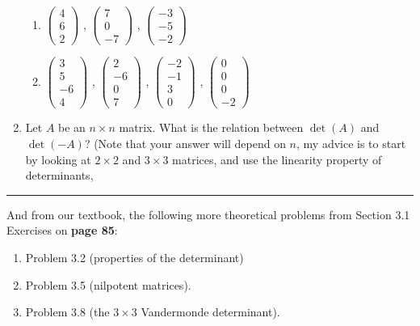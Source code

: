 \documentclass[11pt]{article}     \parskip=5pt
\begin{document}
\begin{enumerate}
\begin{enumerate}
\item 
$\begin{pmatrix}
 4\\ 6 \\ 2
\end{pmatrix}$ 
, $\begin{pmatrix}
7\\ 0 \\ -7
\end{pmatrix}$ 
, $\begin{pmatrix}
 -3\\ -5 \\ -2
\end{pmatrix}$ 


\item 
$\begin{pmatrix}
3 \\ 5 \\ -6 \\ 4
\end{pmatrix}$ 
, $\begin{pmatrix}
2 \\ -6 \\ 0 \\ 7
\end{pmatrix}$ 
, $\begin{pmatrix}
-2 \\ -1 \\ 3 \\ 0
\end{pmatrix}$ 
, $\begin{pmatrix}
0 \\ 0 \\ 0 \\ -2
\end{pmatrix}$


\end{enumerate}
\item Let $A$ be an $n\times n$ matrix. What is the relation between $\det(A)$ and $\det(-A)$? (Note that your answer will depend on $n$, my advice is to start by looking at $2\times 2$ and $3\times 3$ matrices, and use the linearity property of determinants,
\end{enumerate}

\hrule
And from our textbook, the following more theoretical problems from Section 3.1 Exercises on \textbf{page 85}:

\begin{enumerate}[resume]
\item Problem 3.2 (properties of the determinant)
\item Problem 3.5 (nilpotent matrices).
\item Problem 3.8 (the $3\times 3$ Vandermonde determinant).
\end{enumerate}
\end{document}
